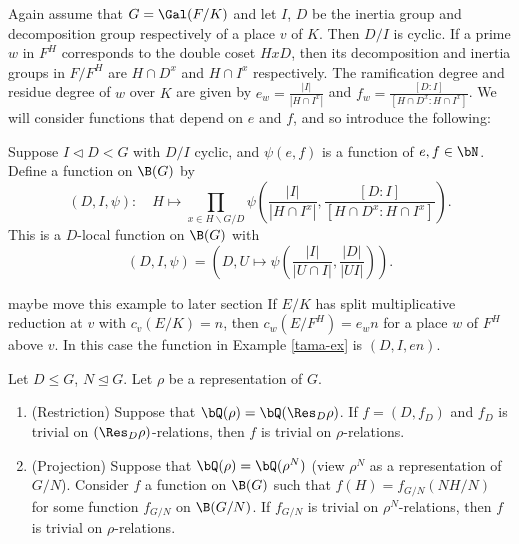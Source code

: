 Again assume that $G = \Gal(F / K)$ and let $I$, $D$ be the inertia group and decomposition group respectively of a place $v$ of $K$.  Then $D / I$ is cyclic. If a prime $w$ in $F^H$ corresponds to the double coset $HxD$, then its decomposition and inertia groups in $F / F^H$ are $H \cap D^x$ and $H \cap I^x$ respectively.
The ramification degree and residue degree of $w$ over $K$ are given by $e_w = \frac{|I|}{|H \cap I^x|}$ and $f_w = \frac{[D : I]}{[H \cap D^x : H \cap I^x]}$. We will consider functions that depend on $e$ and $f$, and so introduce the following:

\begin{defn}\cite[Definition 2.35]{reg-const}\label{D-I-fn}
    Suppose $I \triangleleft D < G$ with $D / I$ cyclic, and $\psi(e,f)$ is a function of $e, f \in \bN$. Define a function on $\B(G)$ by 
    \[ \left(D, I, \psi\right) \colon \quad H \mapsto \prod_{x \in H\backslash G / D} \psi\left(\frac{|I|}{|H \cap I^x|}, \frac{[D : I]}{[H \cap D^x : H \cap I^x]}\right). \]
    This is a $D$-local function on $\B(G)$ with
    \[ (D, I, \psi) = \left(D, U \mapsto \psi\left(\frac{|I|}{|U \cap I|}, \frac{|D|}{|UI|}\right)\right). \]
\end{defn}

\begin{example} {\color{red} maybe move this example to later section}
    If $E / K$ has split multiplicative reduction at $v$ with $c_v(E / K) = n$, then $c_w(E / F^H) = e_w n$ for a place $w$ of $F^H$ above $v$. In this case the function in Example \ref{tama-ex} is $(D, I, e n)$. 
\end{example}


\begin{prop}
    Let $D \leq G$, $N \trianglelefteq G$. Let $\rho$ be a representation of $G$.
    \begin{enumerate}
        \item (Restriction) Suppose that $\bQ(\rho) = \bQ(\Res_D \rho)$. If $f = (D, f_D)$ and $f_D$ is trivial on $(\Res_D \rho)$-relations, then $f$ is trivial on $\rho$-relations.
        \item (Projection) Suppose that $\bQ(\rho) = \bQ(\rho^N)$ (view $\rho^N$ as a representation of $G / N$). Consider $f$ a function on $\B(G)$ such that $f(H) = f_{G / N}(N H / N)$ for some function $f_{G / N}$ on $\B(G / N)$. If $f_{G / N}$ is trivial on $\rho^N$-relations, then $f$ is trivial on $\rho$-relations.
    \end{enumerate}
\end{prop}

